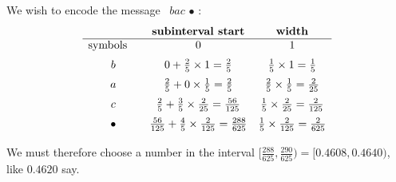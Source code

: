 \documentclass[11pt]{article}
\begin{document}
\bigskip{}
We wish to encode the message \, $bac\,\bullet$\,:
\[\begin{array}{ccc}
                       &\text{\bf subinterval start}                                       & \text{\bf width}\\\hline
    \text{symbols}\quad&                   0                                               &            1     \\[2mm]
          b            & 0 + \frac{2}{5}\times 1 = \frac{2}{5}                             & \frac{1}{5}\times1             = \frac{1}{  5}\\[2mm]
          a            & \frac{2}{5} + 0\times\frac{1}{5} = \frac{2}{5}                    & \frac{2}{5}\times\frac{1}{  5} = \frac{2}{ 25}\\[2mm]
          c            & \frac{2}{5} + \frac{3}{5}\times\frac{2}{25} = \frac{56}{125}      & \frac{1}{5}\times\frac{2}{ 25} = \frac{2}{125}\\[2mm]
       \bullet         & \frac{56}{125} + \frac{4}{5}\times\frac{2}{125} = \frac{288}{625} & \frac{1}{5}\times\frac{2}{125} = \frac{2}{625}\\[2mm]
  \end{array}\]
We must therefore choose a number in the interval $[\frac{288}{625}, \frac{290}{625}) = [0.4608, 0.4640)$, like $0.4620$ say.
\end{document}

